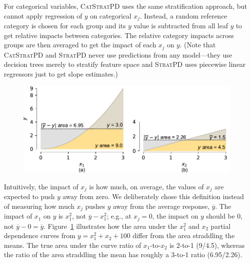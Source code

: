 \documentclass[11pt]{article}
\newcommand{\figref}[1]{Figure~\ref{#1}}
\newcommand{\todo}[1]{{{\color{red}{[#1]}}}}
\newcommand{\spd}{\fontfamily{cmr}\textsc{\small StratPD}}
\newcommand{\cspd}{\fontfamily{cmr}\textsc{\small CatStratPD}}
\begin{document}
For categorical variables, \cspd{} uses the same stratification approach, but cannot apply  regression of $y$ on categorical $x_j$. Instead, a random reference category is chosen for each group and its $y$ value is subtracted from all leaf $y$ to get relative impacts between categories. The relative category impacts across groups are then averaged to get the impact of each $x_j$ on $y$.  (Note that \cspd{} and \spd{} never use predictions from any model---they use decision trees merely to stratify feature space and \spd{} uses piecewise linear regressors just to get slope estimates.)

\begin{figure}[htbp]
\begin{center}
\includegraphics[scale=0.65]{images/from-mean-auc.pdf}
\label{fig:combined-area}
\end{center}
\end{figure}

Intuitively, the impact of $x_j$ is how much, on average, the values of $x_j$ are expected to push $y$ away from zero. We deliberately chose this  definition instead of measuring how much $x_j$ pushes $y$ away from the average response, $\overline{y}$. The impact of $x_1$ on $y$ is $x_1^2$, not $\overline{y} - x_1^2$; e.g., at $x_j=0$, the impact on $y$ should be 0, not $\overline{y}-0 = \overline{y}$.  \figref{fig:combined-area} illustrates how the area under the $x_1^2$ and $x_2$ partial dependence curves from $y = x_1^2+x_2+100$ differ from the area straddling the means. The true area under the curve ratio of $x_1$-to-$x_2$ is 2-to-1 (9/4.5), whereas the ratio of the area straddling the mean has roughly a 3-to-1 ratio (6.95/2.26). \todo{is this clear enough?}
\end{document}
